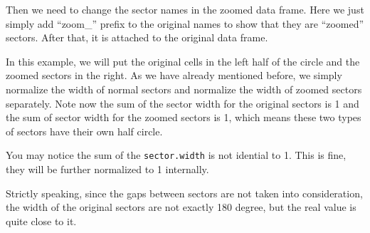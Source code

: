 \documentclass[]{book}
\newenvironment{Shaded}{\begin{snugshade}}{\end{snugshade}}
\newcommand{\KeywordTok}[1]{\textcolor[rgb]{0.13,0.29,0.53}{\textbf{#1}}}
\newcommand{\StringTok}[1]{\textcolor[rgb]{0.31,0.60,0.02}{#1}}
\newcommand{\ControlFlowTok}[1]{\textcolor[rgb]{0.13,0.29,0.53}{\textbf{#1}}}
\newcommand{\OperatorTok}[1]{\textcolor[rgb]{0.81,0.36,0.00}{\textbf{#1}}}
\newcommand{\NormalTok}[1]{#1}
\begin{document}
Then we need to change the sector names in the zoomed data frame. Here
we just simply add ``zoom\_'' prefix to the original names to show that
they are ``zoomed'' sectors. After that, it is attached to the original
data frame.

\begin{Shaded}
\end{Shaded}

In this example, we will put the original cells in the left half of the
circle and the zoomed sectors in the right. As we have already mentioned
before, we simply normalize the width of normal sectors and normalize
the width of zoomed sectors separately. Note now the sum of the sector
width for the original sectors is 1 and the sum of sector width for the
zoomed sectors is 1, which means these two types of sectors have their
own half circle.

You may notice the sum of the \texttt{sector.width} is not idential to
1. This is fine, they will be further normalized to 1 internally.

Strictly speaking, since the gaps between sectors are not taken into
consideration, the width of the original sectors are not exactly 180
degree, but the real value is quite close to it.

\begin{Shaded}
\end{Shaded}
\end{document}

